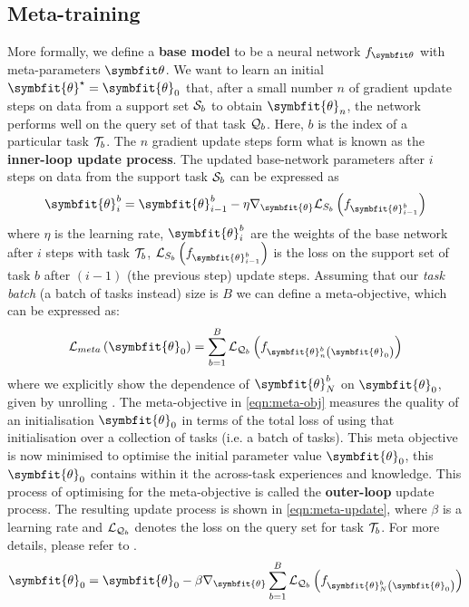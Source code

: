 \subsection{Meta-training}\label{ssec:meta-training}
More formally, we define a \textbf{base model} to be a neural network $\ft$ with meta-parameters $\symbfit \theta$. We want to learn an initial $\symbfit{\theta}^\star = \symbfit{\theta}_0$ that, after a small number $n$ of gradient update steps on data from a support set $\mathcal{S}_b$ to obtain $\symbfit{\theta}_n$, the network performs well on the query set of that task $\mathcal{Q}_b$. Here, $b$ is the index of a particular task $\mathcal{T}_b$. The $n$ gradient update steps form what is known as the \textbf{inner-loop update process}. The updated base-network parameters after $i$ steps on data from the support task $\mathcal{S}_b$ can be expressed as
\begin{equation}
\label{eqn:inner-update}
\symbfit{\theta}_{i}^{b}=\symbfit{\theta}_{i-1}^{b}-\eta \nabla_{\symbfit{\theta}} \mathcal{L}_{S_{b}}\left(f_{\symbfit{\theta}_{i-1}^{b}}\right)
\end{equation}
where $\eta$ is the learning rate, $\symbfit{\theta}_i^b$ are the weights of the base network after $i$ steps with task $\mathcal{T}_b$, $\mathcal{L}_{S_{b}}\left(f_{\symbfit{\theta}_{i-1}^{b}}\right)$ is the loss on the support set of task $b$ after $(i-1)$ (the previous step) update steps. Assuming that our \textit{task batch} (a batch of tasks instead) size is $B$ we can define a meta-objective, which can be expressed as:
\begin{equation}
\label{eqn:meta-obj}
\mathcal{L}_{m e t a}\left(\symbfit{\theta}_{0}\right)=\sum_{b=1}^{B} \mathcal{L}_{\mcQ_{b}}\left(f_{\symbfit{\theta}_{n}^{b}\left(\symbfit{\theta}_{0}\right)}\right)
\end{equation}
where we explicitly show the dependence of $\symbfit{\theta}_N^b$ on $\symbfit{\theta}_0$, given by unrolling . The meta-objective in \cref{eqn:meta-obj} measures the quality of an initialisation $\symbfit{\theta}_0$ in terms of the total loss of using that initialisation over a collection of tasks (i.e. a batch of tasks).
This meta objective is now minimised to optimise the initial parameter value $\symbfit{\theta}_0$, this $\symbfit{\theta}_0$ contains within it the across-task experiences and knowledge. This process of optimising for the meta-objective is called the \textbf{outer-loop} update process.
The resulting update process is shown in \cref{eqn:meta-update}, where $\beta$ is a learning rate and $\mathcal{L}_{\mathcal{Q}_b}$ denotes the loss on the query set for task $\mathcal{T}_b$.
For more details, please refer to \parencite{Finn2017Model-agnosticNetworks, antoniou2018train}.
\begin{equation}
\label{eqn:meta-update}
\symbfit{\theta}_{0}=\symbfit{\theta}_{0}-\beta \nabla_{\symbfit{\theta}} \sum_{b=1}^{B} \mathcal{L}_{\mcQ_{b}}\left(f_{\symbfit{\theta}_{N}^{b}\left(\symbfit{\theta}_{0}\right)}\right)
\end{equation}

